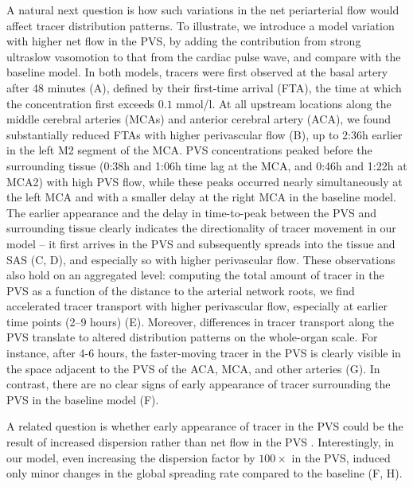 \documentclass[fleqn,10pt]{wlscirep}
\begin{document}


A natural next question is how such variations in the net
periarterial flow would affect tracer distribution patterns. To
illustrate, we introduce a model variation with higher net flow in the
PVS, by adding the contribution from strong ultraslow vasomotion to
that from the cardiac pulse wave, and compare with the baseline model.
%
In both models, tracers were first observed at the basal artery after
48 minutes (A), defined by their first-time
arrival (FTA), the time at which the concentration first exceeds $0.1$
mmol/l. At all upstream locations along the middle cerebral arteries
(MCAs) and anterior cerebral artery (ACA), we found substantially
reduced FTAs with higher perivascular flow (B), up to
2:36h earlier in the left M2 segment of the MCA. PVS
concentrations peaked before the surrounding tissue (0:38h and 1:06h time lag at
the MCA, and 0:46h and 1:22h at MCA2) with high PVS flow, while these
peaks occurred nearly simultaneously at the left MCA and with a smaller delay at the right MCA in the baseline model. The
earlier appearance and the delay in time-to-peak between the PVS and
surrounding tissue clearly indicates the directionality of tracer
movement in our model -- it first arrives in the PVS and subsequently
spreads into the tissue and SAS (C, D), and
especially so with higher perivascular flow. These observations also hold on an
aggregated level: computing the total amount of tracer in the PVS as a
function of the distance to the arterial network roots, we find
accelerated tracer transport with higher perivascular flow, especially at
earlier time points (2--9 hours) (E). Moreover,
differences in tracer transport along the PVS translate to altered
distribution patterns on the whole-organ scale. For instance, after
4-6 hours, the faster-moving tracer in the PVS is clearly visible in
the space adjacent to the PVS of the ACA, MCA, and other arteries
(G). In contrast, there are no clear signs of
early appearance of tracer surrounding the PVS in the baseline model
(F).

A related question is whether early appearance of tracer in the PVS
could be the result of increased dispersion rather than net flow in
the PVS
\cite{asgari2016glymphatic,sharp2019dispersion,bojarskaite2023sleep,asgari2016glymphatic,troyetsky2021dispersion}. Interestingly,
in our model, even increasing the dispersion factor by $100 \times$ in
the PVS, induced only minor changes in the global spreading rate
compared to the baseline (F, H).
\end{document}
